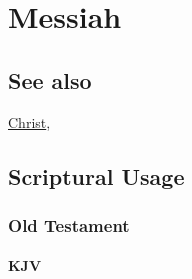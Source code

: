 \section{Messiah}
	\label{MESSIAH}
	
\subsection{See also}

	\hyperref[CHRIST]{Christ}, 





\subsection{Scriptural Usage} %
	\label{MESSIAH-SCRIPTURES}

	\subsubsection{Old Testament} %
		\label{MESSIAH-OT}
	
		\paragraph{KJV}
			\label{MESSIAH-OT-KJV}
	
